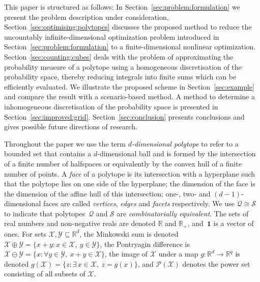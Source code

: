 \documentclass[letterpaper, 10pt, conference]{ieeeconf} %
\providecommand{\bfa}[1]{\mathbf{#1}}
\begin{document}
%
This paper is structured as follows:
%
In Section~\ref{sec:problem:formulation} we present the problem description under consideration, Section~\ref{sec:optimising:polytopes} discusses the proposed method to reduce the uncountably infinite-dimensional optimization problem introduced in Section~\ref{sec:problem:formulation} to a finite-dimensional nonlinear optimization.
%
Section~\ref{sec:counting:cubes} deals with the problem of approximating the probability measure of a polytope using a homogeneous discretisation of the probability space, thereby reducing integrals into finite sums which can be efficiently evaluated.
%
We illustrate the proposed scheme in Section~\ref{sec:example} and compare the result with a scenario-based method.
%
A method to determine a inhomogeneous discretisation of the probability space is presented in Section~\ref{sec:improved:grid}.
%
Section~\ref{sec:conclusion} presents conclusions and gives possible future directions of research.
%


%
Throughout the paper we use the term \textit{$d$-dimensional polytope} to refer to a bounded set that contains a $d$-dimensional ball and is formed by the intersection of a finite number of halfspaces or equivalently by the convex hull of a finite number of points.
A \textit{face} of a polytope is its intersection with a hyperplane such that the polytope lies on one side of the hyperplane; the dimension of the face is the dimension of the affine hull of this intersection; one-, two- and ${(d-1)}$-dimensional faces are called \textit{vertices}, \textit{edges} and \textit{facets} respectively. 
We use $\mathcal Q \cong \mathcal S$ to indicate that polytopes~$\mathcal Q$ and $\mathcal S$ are \textit{combinatorially equivalent}.
%
The sets of real numbers and non-negative reals are denoted $\mathbb R$ and $\mathbb R_+$, and~$\bfa{1}$ is a vector of ones. 
%
For sets $\mathcal X,\mathcal Y\subseteq\mathbb R^d$, the Minkowski sum is denoted $\mathcal X \oplus \mathcal Y = \{ x + y : x\in\mathcal X, \ y\in \mathcal Y\}$, the Pontryagin difference is $\mathcal X \ominus \mathcal Y = \{ x: \forall y \in \mathcal Y, \ x+ y\in\mathcal X \}$, the image of $\mathcal X$ under a map $g:\mathbb R^d \to \mathbb R^q$ is denoted $g(\mathcal X) = \{z : \exists\, x\in\mathcal X, \ z = g(x)\}$, and $\mathscr P (\mathcal X)$ denotes the power set consisting of all subsets of $\mathcal X$.

%
\end{document}
